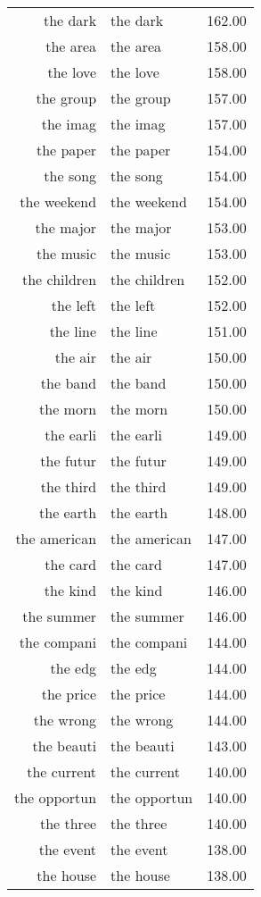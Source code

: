 \begin{table}[ht]
\begin{tabular}{rlr}
  the dark & the dark & 162.00 \\ 
  the area & the area & 158.00 \\ 
  the love & the love & 158.00 \\ 
  the group & the group & 157.00 \\ 
  the imag & the imag & 157.00 \\ 
  the paper & the paper & 154.00 \\ 
  the song & the song & 154.00 \\ 
  the weekend & the weekend & 154.00 \\ 
  the major & the major & 153.00 \\ 
  the music & the music & 153.00 \\ 
  the children & the children & 152.00 \\ 
  the left & the left & 152.00 \\ 
  the line & the line & 151.00 \\ 
  the air & the air & 150.00 \\ 
  the band & the band & 150.00 \\ 
  the morn & the morn & 150.00 \\ 
  the earli & the earli & 149.00 \\ 
  the futur & the futur & 149.00 \\ 
  the third & the third & 149.00 \\ 
  the earth & the earth & 148.00 \\ 
  the american & the american & 147.00 \\ 
  the card & the card & 147.00 \\ 
  the kind & the kind & 146.00 \\ 
  the summer & the summer & 146.00 \\ 
  the compani & the compani & 144.00 \\ 
  the edg & the edg & 144.00 \\ 
  the price & the price & 144.00 \\ 
  the wrong & the wrong & 144.00 \\ 
  the beauti & the beauti & 143.00 \\ 
  the current & the current & 140.00 \\ 
  the opportun & the opportun & 140.00 \\ 
  the three & the three & 140.00 \\ 
  the event & the event & 138.00 \\ 
  the house & the house & 138.00 \\ 

\end{tabular}
\end{table}
